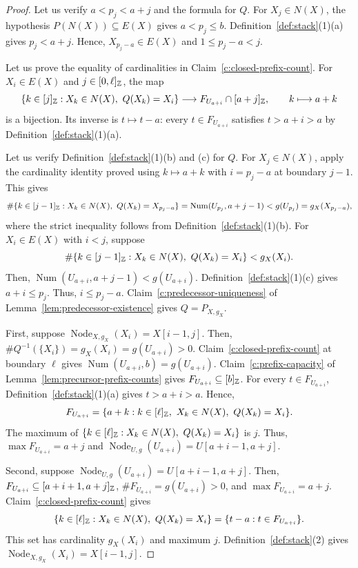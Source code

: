 \begin{proof}
 Let us verify $a<p_j<a+j$ and the formula for $Q$.
For $X_j\in N(X)$, the hypothesis $P(N(X))\subseteq E(X)$ gives $a<p_j\le b$.
Definition~\ref{def:stack}(1)(a) gives $p_j<a+j$.
Hence, $X_{p_j-a}\in E(X)$ and $1\le p_j-a<j$.

Let us prove the equality of cardinalities in Claim~\ref{c:closed-prefix-count}.
For $X_i\in E(X)$ and $j\in[0,\ell]_{\mathbb Z}$, the map
\[
 \{k\in[j]_{\mathbb Z}:X_k\in N(X),\ Q(X_k)=X_i\}
 \longrightarrow F_{U_{a+i}}\cap[a+j]_{\mathbb Z},\qquad k\longmapsto a+k
\]
is a bijection. Its inverse is $t\mapsto t-a$: every $t\in F_{U_{a+i}}$ satisfies $t>a+i>a$ by Definition~\ref{def:stack}(1)(a).

Let us verify Definition~\ref{def:stack}(1)(b) and (c) for $Q$.
For $X_j\in N(X)$, apply the cardinality identity proved using $k\mapsto a+k$ with $i=p_j-a$ at boundary $j-1$. This gives
\[
 \#\{k\in[j-1]_{\Z}:X_k\in N(X),\ Q(X_k)=X_{p_j-a}\}
 =\operatorname{Num}(U_{p_j},a+j-1)<g(U_{p_j})=g_X(X_{p_j-a}),
\]
where the strict inequality follows from Definition~\ref{def:stack}(1)(b).
For $X_i\in E(X)$ with $i<j$, suppose
\[
 \#\{k\in[j-1]_{\Z}:X_k\in N(X),\ Q(X_k)=X_i\}<g_X(X_i).
\]
Then, $\operatorname{Num}(U_{a+i},a+j-1)<g(U_{a+i})$.
Definition~\ref{def:stack}(1)(c) gives $a+i\le p_j$. Thus, $i\le p_j-a$.
Claim~\ref{c:predecessor-uniqueness} of Lemma~\ref{lem:predecessor-existence}
gives $Q=P_{X,g_X}$.

 First, suppose $\operatorname{Node}_{X,g_X}(X_i)=X[i-1,j]$.
Then, $\#Q^{-1}(\{X_i\})=g_X(X_i)=g(U_{a+i})>0$.
Claim~\ref{c:closed-prefix-count} at boundary $\ell$ gives
$\operatorname{Num}(U_{a+i},b)=g(U_{a+i})$.
Claim~\ref{c:prefix-capacity} of Lemma~\ref{lem:precursor-prefix-counts} gives $F_{U_{a+i}}\subseteq[b]_{\mathbb Z}$.
For every $t\in F_{U_{a+i}}$, Definition~\ref{def:stack}(1)(a) gives $t>a+i>a$.
Hence,
\[
 F_{U_{a+i}}
 =\{a+k:k\in[\ell]_{\mathbb Z},\ X_k\in N(X),\ Q(X_k)=X_i\}.
\]
The maximum of $\{k\in[\ell]_{\Z}:X_k\in N(X),\ Q(X_k)=X_i\}$ is $j$.
Thus, $\max F_{U_{a+i}}=a+j$ and $\operatorname{Node}_{U,g}(U_{a+i})=U[a+i-1,a+j]$.

Second, suppose $\operatorname{Node}_{U,g}(U_{a+i})=U[a+i-1,a+j]$.
Then, $F_{U_{a+i}}\subseteq[a+i+1,a+j]_{\mathbb Z}$, $\#F_{U_{a+i}}=g(U_{a+i})>0$, and $\max F_{U_{a+i}}=a+j$.
Claim~\ref{c:closed-prefix-count} gives
\[
 \{k\in[\ell]_{\Z}:X_k\in N(X),\ Q(X_k)=X_i\}
 =\{t-a:t\in F_{U_{a+i}}\}.
\]
This set has cardinality $g_X(X_i)$ and maximum $j$.
Definition~\ref{def:stack}(2) gives $\operatorname{Node}_{X,g_X}(X_i)=X[i-1,j]$.


\end{proof}
